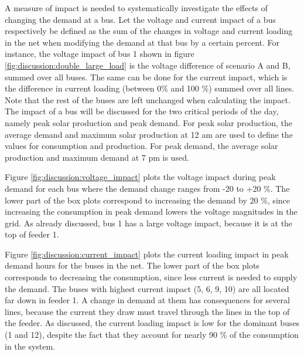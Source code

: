 \documentclass[class=book, crop=false]{standalone}
\begin{document}
A measure of impact is needed to systematically investigate the effects of changing the demand at a bus. Let the voltage and current impact of a bus respectively be defined as the sum of the changes in voltage and current loading in the net when modifying the demand at that bus by a certain percent. For instance, the voltage impact of bus 1 shown in figure \ref{fig:discussion:double_large_load} is the voltage difference of scenario A and B, summed over all buses. The same can be done for the current impact, which is the difference in current loading (between 0\% and 100 \%) summed over all lines. Note that the rest of the buses are left unchanged when calculating the impact. The impact of a bus will be discussed for the two critical periods of the day, namely peak solar production and peak demand. For peak solar production, the average demand and maximum solar production at 12 am are used to define the values for consumption and production. For peak demand, the average solar production and maximum demand at 7 pm is used. 


Figure \ref{fig:discussion:voltage_impact} plots the voltage impact during peak demand for each bus where the demand change ranges from -20 to +20 \%. The lower part of the box plots correspond to increasing the demand by 20 \%, since increasing the consumption in peak demand lowers the voltage magnitudes in the grid. As already discussed, bus 1 has a large voltage impact, because it is at the top of feeder 1. 


Figure \ref{fig:discussion:current_impact} plots the current loading impact in peak demand hours for the buses in the net. The lower part of the box plots corresponds to decreasing the consumption, since less current is needed to supply the demand. The buses with highest current impact (5, 6, 9, 10) are all located far down in feeder 1. A change in demand at them has consequences for several lines, because the current they draw must travel through the lines in the top of the feeder. As discussed, the current loading impact is low for the dominant buses (1 and 12), despite the fact that they account for nearly 90 \% of the consumption in the system. 
\end{document}
